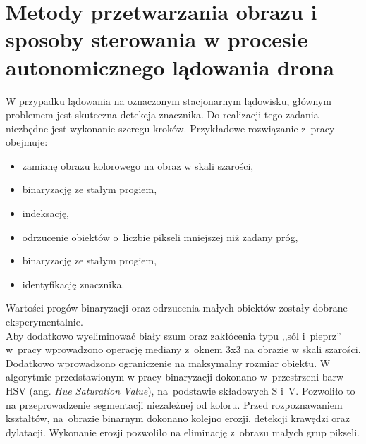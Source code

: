 \chapter{Metody przetwarzania obrazu i sposoby sterowania w procesie autonomicznego lądowania drona}
\label{cha:Metody przetwarzania obrazu i sposoby sterowania w procesie autonomicznego lądowania drona}


W przypadku lądowania na oznaczonym stacjonarnym lądowisku, głównym problemem jest skuteczna detekcja znacznika. 
Do realizacji tego zadania niezbędne jest wykonanie szeregu kroków.
Przykładowe rozwiązanie z~pracy \cite{Rings} obejmuje:
\begin{itemize}
	\item zamianę obrazu kolorowego na obraz w skali szarości,
	\item binaryzację ze stałym progiem,
	\item indeksację,
	\item odrzucenie obiektów o~liczbie pikseli mniejszej niż zadany próg,
	\item binaryzację ze stałym progiem, %
	\item identyfikację znacznika.
\end{itemize}

Wartości progów binaryzacji oraz odrzucenia małych obiektów zostały dobrane eksperymentalnie.\\ 
Aby dodatkowo wyeliminować biały szum oraz zakłócenia typu ,,sól i~pieprz'' w~pracy \cite{H_median} wprowadzono operację mediany z~oknem 3x3 na obrazie w skali szarości. 
Dodatkowo wprowadzono ograniczenie na maksymalny rozmiar obiektu. 
W algorytmie przedstawionym w pracy \cite{FPGA} binaryzacji dokonano w~przestrzeni barw HSV (ang. \textit{Hue Saturation Value}), na~podstawie składowych S i~V. 
Pozwoliło to na przeprowadzenie segmentacji niezależnej od koloru. 
Przed rozpoznawaniem kształtów, na~obrazie binarnym dokonano kolejno erozji, detekcji krawędzi oraz dylatacji. 
Wykonanie erozji pozwoliło na eliminację z~obrazu małych grup pikseli.\par %

